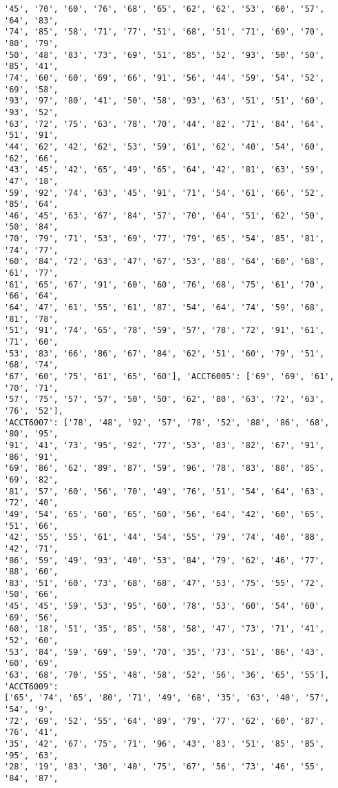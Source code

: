 \documentclass[11pt]{article}
\begin{document}
\begin{Verbatim}[commandchars=\\\{\}]
'45', '70', '60', '76', '68', '65', '62', '62', '53', '60', '57', '64', '83',
'74', '85', '58', '71', '77', '51', '68', '51', '71', '69', '70', '80', '79',
'50', '48', '83', '73', '69', '51', '85', '52', '93', '50', '50', '85', '41',
'74', '60', '60', '69', '66', '91', '56', '44', '59', '54', '52', '69', '58',
'93', '97', '80', '41', '50', '58', '93', '63', '51', '51', '60', '93', '52',
'63', '72', '75', '63', '78', '70', '44', '82', '71', '84', '64', '51', '91',
'44', '62', '42', '62', '53', '59', '61', '62', '40', '54', '60', '62', '66',
'43', '45', '42', '65', '49', '65', '64', '42', '81', '63', '59', '47', '18',
'59', '92', '74', '63', '45', '91', '71', '54', '61', '66', '52', '85', '64',
'46', '45', '63', '67', '84', '57', '70', '64', '51', '62', '50', '50', '84',
'70', '79', '71', '53', '69', '77', '79', '65', '54', '85', '81', '74', '77',
'60', '84', '72', '63', '47', '67', '53', '88', '64', '60', '68', '61', '77',
'61', '65', '67', '91', '60', '60', '76', '68', '75', '61', '70', '66', '64',
'64', '47', '61', '55', '61', '87', '54', '64', '74', '59', '68', '81', '78',
'51', '91', '74', '65', '78', '59', '57', '78', '72', '91', '61', '71', '60',
'53', '83', '66', '86', '67', '84', '62', '51', '60', '79', '51', '68', '74',
'67', '60', '75', '61', '65', '60'], 'ACCT6005': ['69', '69', '61', '70', '71',
'57', '75', '57', '57', '50', '50', '62', '80', '63', '72', '63', '76', '52'],
'ACCT6007': ['78', '48', '92', '57', '78', '52', '88', '86', '68', '80', '95',
'91', '41', '73', '95', '92', '77', '53', '83', '82', '67', '91', '86', '91',
'69', '86', '62', '89', '87', '59', '96', '78', '83', '88', '85', '69', '82',
'81', '57', '60', '56', '70', '49', '76', '51', '54', '64', '63', '72', '40',
'49', '54', '65', '60', '65', '60', '56', '64', '42', '60', '65', '51', '66',
'42', '55', '55', '61', '44', '54', '55', '79', '74', '40', '88', '42', '71',
'86', '59', '49', '93', '40', '53', '84', '79', '62', '46', '77', '88', '60',
'83', '51', '60', '73', '68', '68', '47', '53', '75', '55', '72', '50', '66',
'45', '45', '59', '53', '95', '60', '78', '53', '60', '54', '60', '69', '56',
'60', '18', '51', '35', '85', '58', '58', '47', '73', '71', '41', '52', '60',
'53', '84', '59', '69', '59', '70', '35', '73', '51', '86', '43', '60', '69',
'63', '68', '70', '55', '48', '58', '52', '56', '36', '65', '55'], 'ACCT6009':
['65', '74', '65', '80', '71', '49', '68', '35', '63', '40', '57', '54', '9',
'72', '69', '52', '55', '64', '89', '79', '77', '62', '60', '87', '76', '41',
'35', '42', '67', '75', '71', '96', '43', '83', '51', '85', '85', '95', '63',
'28', '19', '83', '30', '40', '75', '67', '56', '73', '46', '55', '84', '87',

\end{Verbatim}
\end{document}

